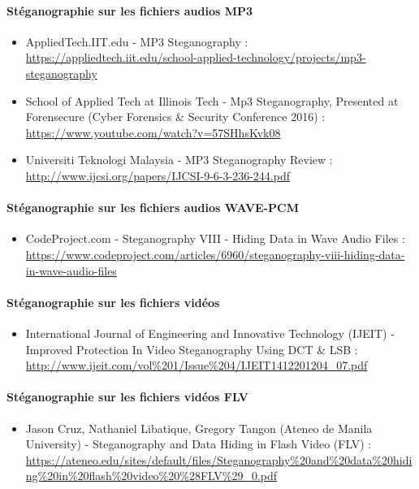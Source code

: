 \documentclass[11pt]{article}
\begin{document}
\paragraph{Stéganographie sur les fichiers audios MP3}
\begin{itemize}
\item AppliedTech.IIT.edu - MP3 Steganography : \\
    \url{https://appliedtech.iit.edu/school-applied-technology/projects/mp3-steganography}
\item School of Applied Tech at Illinois Tech - Mp3 Steganography, Presented at
    Forensecure (Cyber Forensics \& Security Conference 2016) : \\
    \url{https://www.youtube.com/watch?v=57SHhsKvk08}
\item Universiti Teknologi Malaysia - MP3 Steganography Review : \\
    \url{http://www.ijcsi.org/papers/IJCSI-9-6-3-236-244.pdf}
\end{itemize}

\paragraph{Stéganographie sur les fichiers audios WAVE-PCM}
\begin{itemize}
\item CodeProject.com - Steganography VIII - Hiding Data in Wave Audio Files : \\
    \url{https://www.codeproject.com/articles/6960/steganography-viii-hiding-data-in-wave-audio-files}
\end{itemize}

\paragraph{Stéganographie sur les fichiers vidéos}
\begin{itemize}
    \item International Journal of Engineering and Innovative Technology (IJEIT)
    - Improved Protection In Video Steganography Using DCT \& LSB : \\
    \url{http://www.ijeit.com/vol%201/Issue%204/IJEIT1412201204_07.pdf}
\end{itemize}

\paragraph{Stéganographie sur les fichiers vidéos FLV}
\begin{itemize}
    \item Jason Cruz, Nathaniel Libatique, Gregory Tangon (Ateneo de Manila
    University) - Steganography and Data Hiding in Flash Video (FLV) : \\
    \url{https://ateneo.edu/sites/default/files/Steganography%20and%20data%20hiding%20in%20flash%20video%20%28FLV%29_0.pdf}
\end{itemize}
\end{document}
